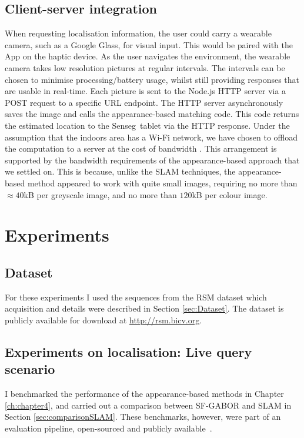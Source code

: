\subsection{Client-server integration}
\label{sec:5}
When requesting localisation information, the user could carry a wearable camera, such as a Google Glass, for visual input. This would be paired with the App on the haptic device. As the user navigates the environment, the wearable camera takes low resolution pictures at regular  intervals. The intervals can be chosen to minimise processing/battery usage, whilst still providing responses that are usable in real-time. Each picture is sent to the Node.js HTTP server via a POST request to a specific URL endpoint. The HTTP server asynchronously saves the image and calls the appearance-based matching code. This code returns the estimated location to the Senseg\texttrademark\ tablet via the HTTP response. Under the assumption that the indoors area has a Wi-Fi network, we have chosen to offload the computation to a server at the cost of bandwidth \citep{simske2013meta}. This arrangement is supported by the bandwidth requirements of the appearance-based approach that we settled on. This is because, unlike the SLAM techniques, the appearance-based method appeared to work with quite small images, requiring no more than $\approx 40$kB per greyscale image, and no more than $120$kB per colour image.


\section{Experiments}
\label{sec:experiments}

\subsection{Dataset}
For these experiments I used the sequences from the RSM dataset which acquisition and details were described in Section \ref{sec:Dataset}. The dataset is publicly available for download at \url{http://rsm.bicv.org}.


\subsection{Experiments on localisation: Live query scenario}

I benchmarked the performance of the appearance-based methods in Chapter \ref{ch:chapter4}, and carried out a comparison between SF-GABOR and SLAM in Section \ref{sec:comparisonSLAM}. These benchmarks, however, were part of an evaluation pipeline, open-sourced and publicly available~\cite{jose_rivera_rubio_2015_33762}.

